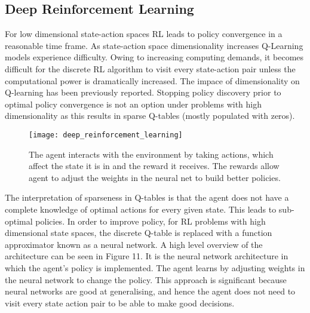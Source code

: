 \subsection{Deep Reinforcement Learning}
For low dimensional state-action spaces RL leads to policy convergence in a reasonable time frame. As state-action space dimensionality increases Q-Learning models experience difficulty. Owing to increasing computing demands, it becomes difficult for the discrete RL algorithm to visit every state-action pair unless the computational power is dramatically increased. The impace of dimensionality on Q-learning has been previously reported. Stopping policy discovery prior to optimal policy convergence is not an option under problems with high dimensionality as this results in sparse Q-tables (mostly populated with zeros).
\begin{figure}[ht]
\centering
\texttt{[image: deep\_reinforcement\_learning]}
\caption{The agent interacts with the environment by taking actions, which affect the state it is in and the reward it receives. The rewards allow agent to adjust the weights in the neural net to build better policies.}
\end{figure}

The interpretation of sparseness in Q-tables is that the agent does not have a complete knowledge of optimal actions for every given state. This leads to sub-optimal policies. In order to improve policy, for RL problems with high dimensional state spaces, the discrete Q-table is replaced with a function approximator known as a neural network. A high level overview of the architecture can be seen in Figure 11. It is the neural network architecture in which the agent's policy is implemented. The agent learns by adjusting weights in the neural network to change the policy. This approach is significant because neural networks are good at generalising, and hence the agent does not need to visit every state action pair to be able to make good decisions.